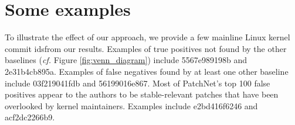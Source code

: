 \appendix
\section{Some examples}

To illustrate the effect of our approach, we provide a few mainline Linux
kernel commit ids\footnotemark[4] from our results.  Examples of true
positives not found by the other baselines ({\em cf.}
Figure \ref{fig:venn_diagram}) include 5567e989198b and 2e31b4cb895a.
Examples of false negatives found by at least one other baseline include
03f219041fdb and 56199016e867.  Most of PatchNet's top 100 false positives
appear to the authors to be stable-relevant patches that have been
overlooked by kernel maintainers.  Examples include e2bd416f6246 and
acf2dc2266b9.
